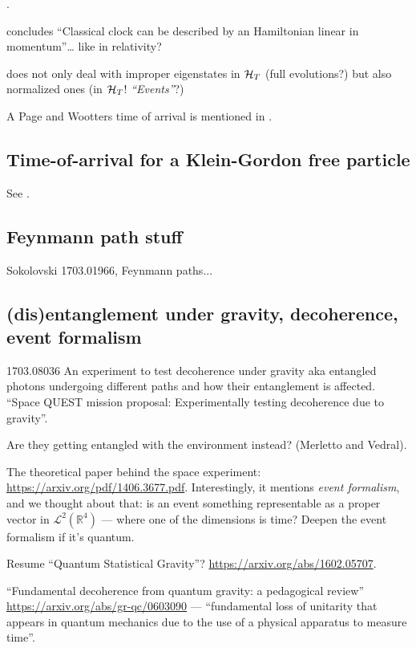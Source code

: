 \cite{RealisticClocks}.

\cite{HarmonicClocks} concludes ``Classical clock can be described by an Hamiltonian linear in momentum''\dots
like in relativity?

\cite{Lloyd:Time} does not only deal with improper eigenstates in $\mathcal{H}_T$
(full evolutions?)
but also normalized ones (in $\mathcal{H}_T$! \emph{``Events''}?)

A Page and Wootters time of arrival is mentioned in \cite{Gambini_PW}.

\subsection{Time-of-arrival for a Klein-Gordon free particle}

See \cite{Galapon_KG}.

\subsection{Feynmann path stuff}

Sokolovski 1703.01966, Feynmann paths...\subsection{(dis)entanglement under gravity, decoherence, event formalism}

1703.08036 An experiment to test decoherence under gravity aka entangled photons undergoing different paths and how their entanglement is affected.
``Space QUEST mission proposal: Experimentally testing decoherence due to gravity''.

Are they getting entangled with the environment instead? (Merletto and Vedral).

The theoretical paper behind the space experiment: \url{https://arxiv.org/pdf/1406.3677.pdf}. Interestingly, it mentions 
\emph{event formalism}, and we thought about that: is an event something
representable as a proper vector in $\mathcal{L}^2(\mathbb{R}^4)$ --- where one of the dimensions is time?
Deepen the event formalism if it's quantum.

Resume ``Quantum Statistical Gravity''? \url{https://arxiv.org/abs/1602.05707}.

``Fundamental decoherence from quantum gravity: a pedagogical review''
\url{https://arxiv.org/abs/gr-qc/0603090} ---
``fundamental loss of unitarity
that appears in quantum mechanics
due to the use of a physical apparatus to measure time''.

